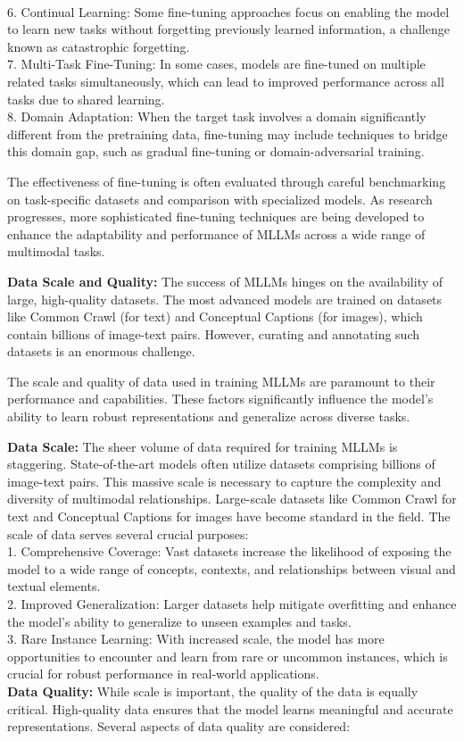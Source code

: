 \\
6. Continual Learning: Some fine-tuning approaches focus on enabling the model to learn new tasks without forgetting previously learned information, a challenge known as catastrophic forgetting.
\\
7. Multi-Task Fine-Tuning: In some cases, models are fine-tuned on multiple related tasks simultaneously, which can lead to improved performance across all tasks due to shared learning.
\\
8. Domain Adaptation: When the target task involves a domain significantly different from the pretraining data, fine-tuning may include techniques to bridge this domain gap, such as gradual fine-tuning or domain-adversarial training.

The effectiveness of fine-tuning is often evaluated through careful benchmarking on task-specific datasets and comparison with specialized models. As research progresses, more sophisticated fine-tuning techniques are being developed to enhance the adaptability and performance of MLLMs across a wide range of multimodal tasks.


\textbf{Data Scale and Quality:} The success of MLLMs hinges on the availability of large, high-quality datasets. The most advanced models are trained on datasets like Common Crawl (for text) and Conceptual Captions (for images), which contain billions of image-text pairs. However, curating and annotating such datasets is an enormous challenge.

The scale and quality of data used in training MLLMs are paramount to their performance and capabilities. These factors significantly influence the model's ability to learn robust representations and generalize across diverse tasks.

\textbf{Data Scale:} The sheer volume of data required for training MLLMs is staggering. State-of-the-art models often utilize datasets comprising billions of image-text pairs. This massive scale is necessary to capture the complexity and diversity of multimodal relationships. Large-scale datasets like Common Crawl for text and Conceptual Captions for images have become standard in the field. The scale of data serves several crucial purposes:
\\
1. Comprehensive Coverage: Vast datasets increase the likelihood of exposing the model to a wide range of concepts, contexts, and relationships between visual and textual elements.
\\
2. Improved Generalization: Larger datasets help mitigate overfitting and enhance the model's ability to generalize to unseen examples and tasks.
\\
3. Rare Instance Learning: With increased scale, the model has more opportunities to encounter and learn from rare or uncommon instances, which is crucial for robust performance in real-world applications.
\\
\textbf{Data Quality:} While scale is important, the quality of the data is equally critical. High-quality data ensures that the model learns meaningful and accurate representations. Several aspects of data quality are considered:

